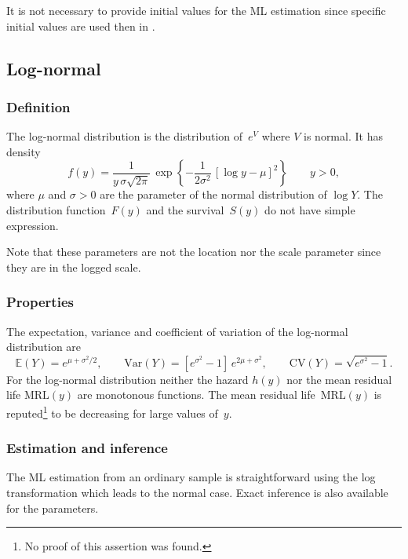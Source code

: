 \documentclass[a4paper]{report}
\newcommand{\Esp}{\mathbb{E}}
\newcommand{\Var}{\textrm{Var}}
\begin{document}


It is not necessary to provide initial values for the ML estimation since 
specific initial values are used then in \verb@Renouv@.



\subsection{Log-normal}

\subsubsection{Definition}
The log-normal distribution is the distribution of~$e^V$ where $V$ is normal. It
has density
\begin{equation}
  \label{eq:defLogNorm}
  f(y) = \frac{1}{y\,\sigma \sqrt{2\pi}}\, 
  \exp\left\{-\frac{1}{2\sigma^2} \,\left[ \log y - \mu \right]^2 \right\} \qquad y > 0,
\end{equation}
where $\mu$ and $\sigma>0$ are the parameter of the normal distribution of $\log Y$.
The distribution function~$F(y)$ and the 
survival~$S(y)$ do not have simple expression.

Note that these parameters are not the location nor the scale parameter since they
are in the logged scale. 

\subsubsection{Properties}
The expectation, variance and coefficient of variation of the log-normal distribution are
$$
  \Esp(Y) = e^{\mu + \sigma^2/2}, \qquad \Var(Y) = \left[e^{\sigma^2} - 1\right] \,e^{2\mu + \sigma^2},
  \qquad \textrm{CV}(Y) = \sqrt{e^{\sigma^2} - 1}.
$$
For the log-normal distribution neither the hazard $h(y)$ nor the mean residual
life $\textrm{MRL}(y)$ are monotonous functions. The mean residual life~$\textrm{MRL}(y)$ is 
reputed\footnote{No proof of this assertion was found.} to be decreasing for large values of~$y$. 

\subsubsection{Estimation and inference}
The ML estimation from an ordinary sample is straightforward using 
the log transformation which leads to the normal case. 
Exact inference is also available for the parameters. 
\end{document}
